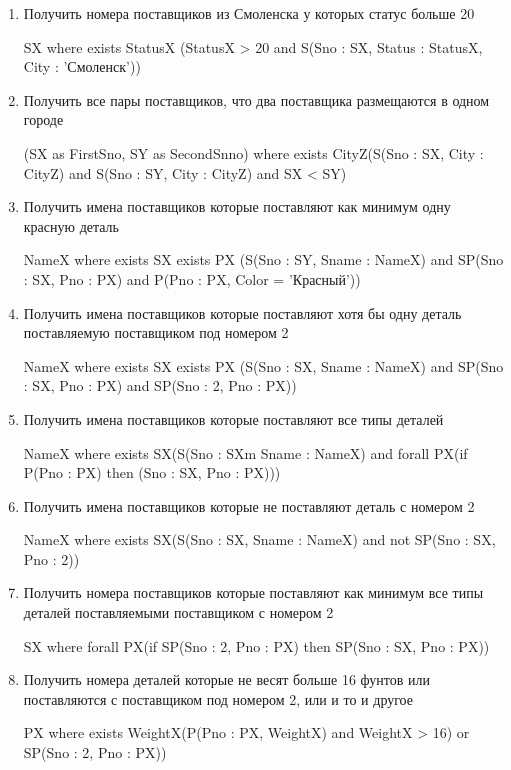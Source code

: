 \documentclass[a4paper, 14pt]{report}
\begin{document}
\begin{enumerate}
    \item Получить номера поставщиков из Смоленска у которых статус больше 20

        SX where exists StatusX (StatusX > 20 and S(Sno : SX, Status : StatusX, City : 'Смоленск'))
    \item Получить все пары поставщиков, что два поставщика размещаются в одном городе

        (SX as FirstSno, SY as SecondSnno) where exists CityZ(S(Sno : SX, City : CityZ) and S(Sno : SY, City : CityZ) and SX < SY)

    \item Получить имена поставщиков которые поставляют как минимум одну красную деталь

        NameX where exists SX exists PX (S(Sno : SY, Sname : NameX) and SP(Sno : SX, Pno : PX) and P(Pno : PX, Color = 'Красный'))

    \item Получить имена поставщиков которые поставляют хотя бы одну деталь поставляемую поставщиком под номером 2

        NameX where exists SX exists PX (S(Sno : SX, Sname : NameX) and SP(Sno : SX, Pno : PX) and SP(Sno : 2, Pno : PX))

    \item Получить имена поставщиков которые поставляют все типы деталей

        NameX where exists SX(S(Sno : SXm Sname : NameX) and forall PX(if P(Pno : PX) then (Sno : SX, Pno : PX)))

    \item Получить имена поставщиков которые не поставляют деталь с номером 2

        NameX where exists SX(S(Sno : SX, Sname : NameX) and not SP(Sno : SX, Pno : 2))

    \item Получить номера поставщиков которые поставляют как минимум все типы деталей поставляемыми поставщиком с номером 2

        SX where forall PX(if SP(Sno : 2, Pno : PX) then SP(Sno : SX, Pno : PX))

    \item Получить номера деталей которые не весят больше 16 фунтов или поставляются с поставщиком под номером 2, или и то и другое

        PX where exists WeightX(P(Pno : PX, WeightX) and WeightX > 16) or SP(Sno : 2, Pno : PX))
\end{enumerate}
\end{document}
